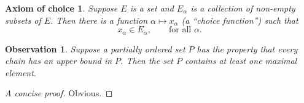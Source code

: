 \newtheorem*{axiomofchoice}{Axiom of choice}
\begin{axiomofchoice}
  Suppose $E$ is a set and ${E_\alpha}$ is a collection of
  non-empty subsets of $E$. Then there is a function $\alpha
  \mapsto x_\alpha$ (a ``choice function'') such that
  \begin{equation}
    x_\alpha \in E_\alpha,\qquad \text{for all }\alpha.
  \end{equation}
\end{axiomofchoice}

\newtheorem{observation}{Observation}
\begin{observation}
  Suppose a partially ordered set $P$ has the property
  that every chain has an upper bound in $P$. Then the
  set $P$ contains at least one maximal element.
\end{observation}
\begin{proof}[A concise proof]
  Obvious.
\end{proof}
